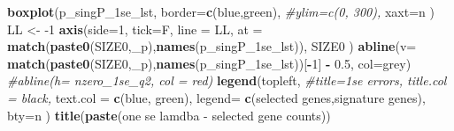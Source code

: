 \documentclass[
]{book}
\newenvironment{Shaded}{\begin{snugshade}}{\end{snugshade}}
\newcommand{\CommentTok}[1]{\textcolor[rgb]{0.56,0.35,0.01}{\textit{#1}}}
\newcommand{\DataTypeTok}[1]{\textcolor[rgb]{0.13,0.29,0.53}{#1}}
\newcommand{\DecValTok}[1]{\textcolor[rgb]{0.00,0.00,0.81}{#1}}
\newcommand{\FloatTok}[1]{\textcolor[rgb]{0.00,0.00,0.81}{#1}}
\newcommand{\KeywordTok}[1]{\textcolor[rgb]{0.13,0.29,0.53}{\textbf{#1}}}
\newcommand{\NormalTok}[1]{#1}
\newcommand{\OperatorTok}[1]{\textcolor[rgb]{0.81,0.36,0.00}{\textbf{#1}}}
\newcommand{\StringTok}[1]{\textcolor[rgb]{0.31,0.60,0.02}{#1}}
\begin{document}
\begin{Shaded}
\begin{Highlighting}[]
\KeywordTok{boxplot}\NormalTok{(p\_singP\_1se\_lst,}
  \DataTypeTok{border=}\KeywordTok{c}\NormalTok{(}\StringTok{\textquotesingle{}blue\textquotesingle{}}\NormalTok{,}\StringTok{\textquotesingle{}green\textquotesingle{}}\NormalTok{),}
  \CommentTok{\#ylim=c(0, 300),}
  \DataTypeTok{xaxt=}\StringTok{\textquotesingle{}n\textquotesingle{}}
\NormalTok{)}
\NormalTok{LL <{-}}\StringTok{ }\DecValTok{{-}1}
\KeywordTok{axis}\NormalTok{(}\DataTypeTok{side=}\DecValTok{1}\NormalTok{, }\DataTypeTok{tick=}\NormalTok{F, }\DataTypeTok{line =}\NormalTok{ LL,}
  \DataTypeTok{at =} \KeywordTok{match}\NormalTok{(}\KeywordTok{paste0}\NormalTok{(SIZE0,}\StringTok{\textquotesingle{}\_p\textquotesingle{}}\NormalTok{),}\KeywordTok{names}\NormalTok{(p\_singP\_1se\_lst)),}
\NormalTok{  SIZE0}
\NormalTok{ )}
\KeywordTok{abline}\NormalTok{(}\DataTypeTok{v=} \KeywordTok{match}\NormalTok{(}\KeywordTok{paste0}\NormalTok{(SIZE0,}\StringTok{\textquotesingle{}\_p\textquotesingle{}}\NormalTok{),}\KeywordTok{names}\NormalTok{(p\_singP\_1se\_lst))[}\OperatorTok{{-}}\DecValTok{1}\NormalTok{] }\OperatorTok{{-}}\StringTok{ }\FloatTok{0.5}\NormalTok{, }\DataTypeTok{col=}\StringTok{\textquotesingle{}grey\textquotesingle{}}\NormalTok{)}
\CommentTok{\#abline(h= nzero\_1se\_q2, col = \textquotesingle{}red\textquotesingle{})}
\KeywordTok{legend}\NormalTok{(}\StringTok{\textquotesingle{}topleft\textquotesingle{}}\NormalTok{,}
   \CommentTok{\#title=\textquotesingle{}1se errors\textquotesingle{}, title.col = \textquotesingle{}black\textquotesingle{},}
   \DataTypeTok{text.col =} \KeywordTok{c}\NormalTok{(}\StringTok{\textquotesingle{}blue\textquotesingle{}}\NormalTok{, }\StringTok{\textquotesingle{}green\textquotesingle{}}\NormalTok{),}
   \DataTypeTok{legend=} \KeywordTok{c}\NormalTok{(}\StringTok{\textquotesingle{}selected genes\textquotesingle{}}\NormalTok{,}\StringTok{\textquotesingle{}signature genes\textquotesingle{}}\NormalTok{),}
   \DataTypeTok{bty=}\StringTok{\textquotesingle{}n\textquotesingle{}}
\NormalTok{ )}
\KeywordTok{title}\NormalTok{(}\KeywordTok{paste}\NormalTok{(}\StringTok{\textquotesingle{}one se lamdba {-} selected gene counts\textquotesingle{}}\NormalTok{))}


\end{Highlighting}
\end{Shaded}
\end{document}
